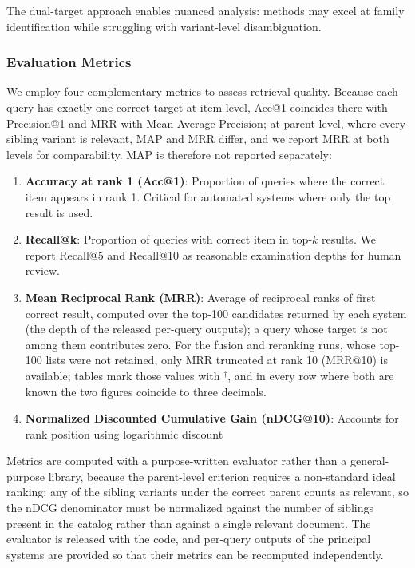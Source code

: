 \documentclass[preprint,review,12pt]{elsarticle}
\begin{document}
The dual-target approach enables nuanced analysis: methods may excel at family identification while struggling with variant-level disambiguation.

\subsubsection{Evaluation Metrics}
\label{subsec:metrics}

We employ four complementary metrics to assess retrieval quality. Because each query has exactly one correct target at item level, Acc@1 coincides there with Precision@1 and MRR with Mean Average Precision; at parent level, where every sibling variant is relevant, MAP and MRR differ, and we report MRR at both levels for comparability. MAP is therefore not reported separately:

\begin{enumerate}
    \item \textbf{Accuracy at rank 1 (Acc@1)}: Proportion of queries where the correct item appears in rank 1. Critical for automated systems where only the top result is used.
    
    \item \textbf{Recall@k}: Proportion of queries with correct item in top-$k$ results. We report Recall@5 and Recall@10 as reasonable examination depths for human review.
    
    \item \textbf{Mean Reciprocal Rank (MRR)}: Average of reciprocal ranks of first correct result, computed over the top-100 candidates returned by each system (the depth of the released per-query outputs); a query whose target is not among them contributes zero. For the fusion and reranking runs, whose top-100 lists were not retained, only MRR truncated at rank 10 (MRR@10) is available; tables mark those values with $^{\dagger}$, and in every row where both are known the two figures coincide to three decimals.
    
    \item \textbf{Normalized Discounted Cumulative Gain (nDCG@10)}: Accounts for rank position using logarithmic discount
\end{enumerate}

Metrics are computed with a purpose-written evaluator rather than a general-purpose library, because the parent-level criterion requires a non-standard ideal ranking: any of the sibling variants under the correct parent counts as relevant, so the nDCG denominator must be normalized against the number of siblings present in the catalog rather than against a single relevant document. The evaluator is released with the code, and per-query outputs of the principal systems are provided so that their metrics can be recomputed independently.
\end{document}
